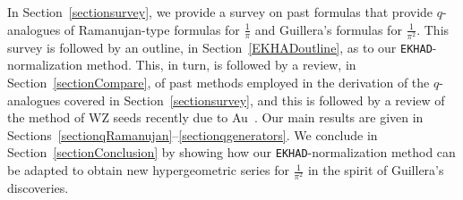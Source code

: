 \documentclass[12pt]{article}
\begin{document}
  In Section~\ref{sectionsurvey}, we provide a survey on past    formulas that provide $q$-analogues of Ramanujan-type formulas for  
  $\frac{1}{\pi}$  and Guillera's formulas for $\frac{1}{\pi^2}$.   This survey is followed by an outline, in Section~\ref{EKHADoutline}, as to  
   our {\tt EKHAD}-normalization method.  This, in turn, is followed by    a review, in Section~\ref{sectionCompare}, of past methods  
    employed in the derivation of the $q$-analogues covered in Section~\ref{sectionsurvey},    and this is followed by a review of the method 
  of WZ seeds  recently due to Au~\cite{Au2025}. 
 Our main results are given in Sections~\ref{sectionqRamanujan}--\ref{sectionqgenerators}.
 We conclude in Section~\ref{sectionConclusion} by showing how our 
 {\tt EKHAD}-normalization method can be adapted
 to obtain new hypergeometric series for $\frac{1}{\pi^2}$ in the spirit of Guillera's discoveries. 
\end{document}

